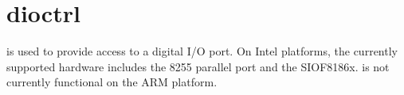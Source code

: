 \section{dioctrl} \label{s:dioctrl}

 is used to provide access to a digital I/O port.
On Intel platforms, the currently supported hardware includes
the 8255 parallel port and the SIOF8186x.
 is not currently functional on the ARM platform.

